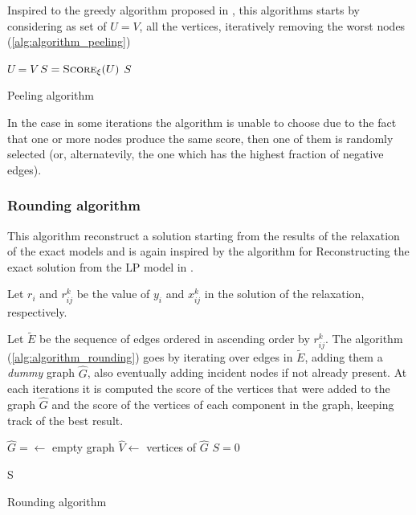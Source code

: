 Inspired to the greedy algorithm proposed in \cite{charikar2000greedy}, this
algorithms starts by considering as set of $U = V$, all the vertices,
iteratively removing the worst nodes (\autoref{alg:algorithm_peeling})

\begin{algorithm}
	\SetAlgoLined
	$U = V$\;
	$S = \textsc{Score}_{\xi}(U)$ \;
	\Return $S$ \;

	\caption{Peeling algorithm}
	\label{alg:algorithm_peeling}
\end{algorithm}

In the case in some iterations the algorithm is unable to choose due to the
fact that one or more nodes produce the same score, then one of them is
randomly selected (or, alternatevily, the one which has the highest fraction of
negative edges).

\subsubsection{Rounding algorithm}%
\label{ssub:rounding_algorithm}

This algorithm reconstruct a solution starting from the results of the
relaxation of the exact models and is again inspired by the algorithm for
Reconstructing the exact solution from the \acrshort{LP} model in
\cite{charikar2000greedy}.

Let $r_{i}$ and $r_{ij} ^{k} $ be the value of $y_i$ and $x_{ij}^{k} $ in the
solution of the relaxation, respectively.

Let $\tilde{E}$ be the sequence of edges ordered in ascending order by $r_{ij}
		^{k} $. The algorithm (\autoref{alg:algorithm_rounding}) goes by iterating over
edges in $\tilde{E}$, adding them a \emph{dummy} graph $\hat{G}$, also eventually
adding incident nodes if not already present. At each iterations it is computed
the score of the vertices that were added to the graph $\hat{G}$ and the score
of the vertices of each component in the graph, keeping track of the best
result.

\begin{algorithm}
	\SetAlgoLined
	$\hat{G} = \leftarrow $ empty graph \;
	$\hat{V} \leftarrow $ vertices of $\hat{G}$ \;
	$S = 0$


	\Return S \;
	\caption{Rounding algorithm}
	\label{alg:algorithm_rounding}
\end{algorithm}

